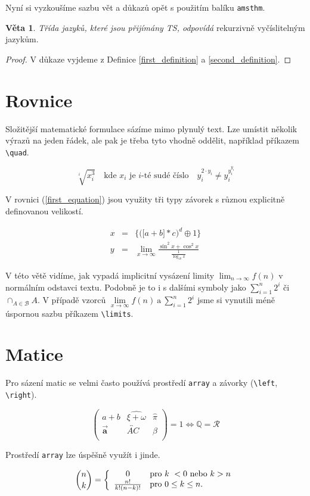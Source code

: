 \documentclass[a4paper, 11pt, twocolumn]{article}
\theoremstyle{definition}
\newtheorem{sentence}{Věta}
\begin{document}
Nyní si vyzkoušíme sazbu vět a důkazů opět s použitím
balíku \verb|amsthm|.

\begin{sentence}
	\emph{Třída jazyků, které jsou přijímány TS, odpovídá} rekurzivně vyčíslitelným jazykům.
\end{sentence}

\begin{proof}
	V důkaze vyjdeme z Definice \ref{first_definition} a \ref{second_definition}.
\end{proof}

\section{Rovnice}
Složitější matematické formulace sázíme mimo plynulý
text. Lze umístit několik výrazů na jeden řádek, ale pak je
třeba tyto vhodně oddělit, například příkazem \verb|\quad|.

$$\sqrt[i]{x^3_i} \quad \text{kde } {x_i} \text{ je } i\text{-té sudé číslo} \quad {y^{2\cdot y_i}_i}\neq {y^{y^{y_i}_i}_i}$$

V rovnici (\ref{first_equation}) jsou využity tři typy závorek s různou explicitně definovanou velikostí.

\begin{eqnarray}
	\label{first_equation} x & = & \bigg\{ \Big( \big[ a + b \big] * c \Big)^d \oplus 1 \bigg\} \\
	\label{second_equation} y & = & \lim_{x \to \infty} \frac{\sin^2x + \cos^2x}{\frac{1}{\log_{10}x}} 
\end{eqnarray}

V této větě vidíme, jak vypadá implicitní vysázení limity $\lim_{n \rightarrow \infty} f(n)$ v normálním odstavci textu. Podobně je to i s dalšími symboly jako $\sum_{i=1}^{n} 2^{i}$ či $\cap_{A\in \mathcal{B}}A$. V případě vzorců ${\lim\limits_{x \rightarrow \infty} f(n)}\ \text{a}\ \sum\limits_{i=1}^{n} 2^{i}$ jsme si vynutili méně úspornou sazbu příkazem \verb|\limits|.

\section{Matice}
Pro sázení matic se velmi často používá prostředí \verb|array| a závorky (\verb|\left|, \verb|\right|).

$$\left(\begin{array}{ccc}a + b & \widehat{\xi + \omega} &\hat{\pi}\\\vec{\textbf{a}} & \overleftrightarrow{AC} & \beta \\\end{array}\right)= 1 \Longleftrightarrow \mathbb{Q} = \mathcal{R}$$

Prostředí \verb|array| lze úspěšně využít i jinde.

$$\binom{n}{k} =\left\{\begin{array}{ll}\hspace{0.5cm}0 & \text{pro } k \ < 0 \text{ nebo } k > n \\\frac{n!}{k! (n - k)!} & \text{pro } 0 \leq k \leq n.\end{array}\right.$$
\end{document}
